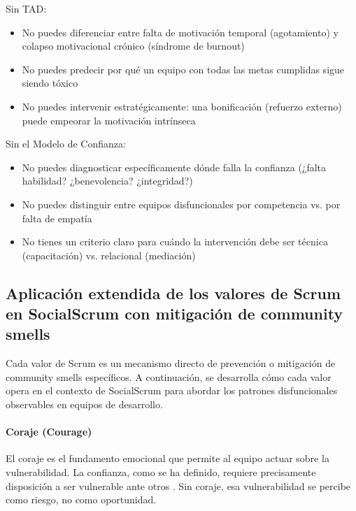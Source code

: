 Sin TAD:
\begin{itemize}
\item No puedes diferenciar entre falta de motivación temporal (agotamiento) y colapso motivacional crónico (síndrome de burnout)
\item No puedes predecir por qué un equipo con todas las metas cumplidas sigue siendo tóxico
\item No puedes intervenir estratégicamente: una bonificación (refuerzo externo) puede empeorar la motivación intrínseca
\end{itemize}

Sin el Modelo de Confianza:
\begin{itemize}
\item No puedes diagnosticar específicamente dónde falla la confianza (¿falta habilidad? ¿benevolencia? ¿integridad?)
\item No puedes distinguir entre equipos disfuncionales por competencia vs. por falta de empatía
\item No tienes un criterio claro para cuándo la intervención debe ser técnica (capacitación) vs. relacional (mediación)
\end{itemize}


\subsection{Aplicación extendida de los valores de Scrum en SocialScrum con mitigación de community smells}

Cada valor de Scrum es un mecanismo directo de prevención o mitigación de community smells específicos. A continuación, se desarrolla cómo cada valor opera en el contexto de SocialScrum para abordar los patrones disfuncionales observables en equipos de desarrollo.

\paragraph{Coraje (Courage)}

El coraje es el fundamento emocional que permite al equipo actuar sobre la vulnerabilidad. La confianza, como se ha definido, requiere precisamente disposición a ser vulnerable ante otros \cite{mayer_integrative_1995}. Sin coraje, esa vulnerabilidad se percibe como riesgo, no como oportunidad.

